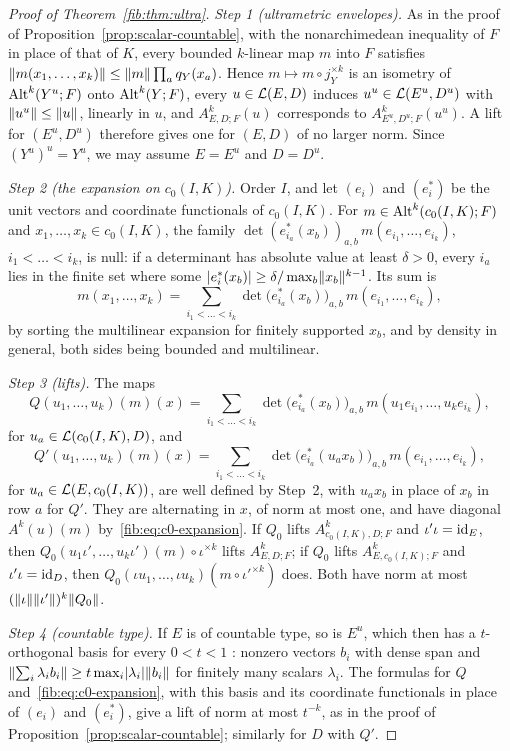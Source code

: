 \begin{proof}[Proof of Theorem~\ref{fib:thm:ultra}]
\emph{Step 1 (ultrametric envelopes).} As in the proof of Proposition~\ref{prop:scalar-countable}, with the
nonarchimedean inequality of $F$ in place of that of $K$, every bounded $k$\nobreakdash-linear map $m$ into $F$ satisfies
$\lVert m(x_1,\dots,x_k)\rVert\le\lVert m\rVert\prod_aq_Y(x_a)$. Hence $m\mapsto m\circ j_Y^{\times k}$ is an isometry of
$\operatorname{Alt}^k(Y^u;F)$ onto $\operatorname{Alt}^k(Y;F)$, every $u\in\mathcal L(E,D)$ induces $u^u\in\mathcal L(E^u,D^u)$ with $\lVert u^u\rVert\le\lVert u\rVert$,
linearly in $u$, and $A^k_{E,D;F}(u)$ corresponds to $A^k_{E^u,D^u;F}(u^u)$. A lift for $(E^u,D^u)$ therefore gives one
for $(E,D)$ of no larger norm. Since $(Y^u)^u=Y^u$, we may assume $E=E^u$ and $D=D^u$.

\emph{Step 2 (the expansion on $c_0(I,K)$).} Order $I$, and let $(e_i)$ and $(e^*_i)$ be the unit vectors and
coordinate functionals of $c_0(I,K)$. For $m\in\operatorname{Alt}^k(c_0(I,K);F)$ and $x_1,\dots,x_k\in c_0(I,K)$, the family
$\det(e^*_{i_a}(x_b))_{a,b}\,m(e_{i_1},\dots,e_{i_k})$, $i_1<\dots<i_k$, is null: if a determinant has absolute value at
least $\delta>0$, every $i_a$ lies in the finite set where some $\lvert e^*_i(x_b)\rvert\ge\delta/\max_b\lVert x_b\rVert^{k-1}$. Its
sum is
\begin{equation}\label{fib:eq:c0-expansion}
 m(x_1,\dots,x_k)=\sum_{i_1<\dots<i_k}\det\bigl(e^*_{i_a}(x_b)\bigr)_{a,b}\,m(e_{i_1},\dots,e_{i_k}),
\end{equation}
by sorting the multilinear expansion for finitely supported $x_b$, and by density in general, both sides being bounded
and multilinear.

\emph{Step 3 (lifts).} The maps
\[
 Q(u_1,\dots,u_k)(m)(x)=\sum_{i_1<\dots<i_k}\det\bigl(e^*_{i_a}(x_b)\bigr)_{a,b}\,m(u_1e_{i_1},\dots,u_ke_{i_k}),
\]
for $u_a\in\mathcal L(c_0(I,K),D)$, and
\[
 Q'(u_1,\dots,u_k)(m)(x)=\sum_{i_1<\dots<i_k}\det\bigl(e^*_{i_a}(u_ax_b)\bigr)_{a,b}\,m(e_{i_1},\dots,e_{i_k}),
\]
for $u_a\in\mathcal L(E,c_0(I,K))$, are well defined by Step~2, with $u_ax_b$ in place of $x_b$ in row $a$ for $Q'$. They are
alternating in $x$, of norm at most one, and have diagonal $A^k(u)(m)$ by~\eqref{fib:eq:c0-expansion}. If $Q_0$ lifts
$A^k_{c_0(I,K),D;F}$ and $\iota'\iota=\mathrm{id}_E$, then $Q_0(u_1\iota',\dots,u_k\iota')(m)\circ\iota^{\times k}$ lifts
$A^k_{E,D;F}$; if $Q_0$ lifts $A^k_{E,c_0(I,K);F}$ and $\iota'\iota=\mathrm{id}_D$, then
$Q_0(\iota u_1,\dots,\iota u_k)(m\circ\iota'^{\times k})$ does. Both have norm at most
$(\lVert \iota\rVert\lVert \iota'\rVert)^k\lVert Q_0\rVert$.

\emph{Step 4 (countable type).} If $E$ is of countable type, so is $E^u$, which then has a $t$\nobreakdash-orthogonal
basis for every $0<t<1$ \cite[Proposition~1.4]{VdP}: nonzero vectors $b_i$ with dense span and
$\lVert \sum_i\lambda_ib_i\rVert\ge t\max_i\lvert \lambda_i\rvert\lVert b_i\rVert$ for finitely many scalars $\lambda_i$. The formulas for
$Q$ and~\eqref{fib:eq:c0-expansion}, with this basis and its coordinate functionals in place of $(e_i)$ and $(e^*_i)$,
give a lift of norm at most $t^{-k}$, as in the proof of Proposition~\ref{prop:scalar-countable}; similarly for $D$
with $Q'$.
\end{proof}

